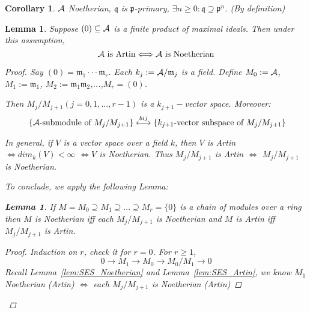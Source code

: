 \documentclass[11pt]{article}
\newtheorem{lemma}[thm]{Lemma}
\newtheorem{cor}[thm]{Corollary}
\newcommand{\scm}{{\mathfrak m}}
\newcommand{\scp}{{\mathfrak p}}
\newcommand{\scq}{\mathfrak q}
\newcommand{\cala}{{\cal A}}
\newcommand{\lrta}{\longrightarrow}
\newcommand{\llrta}{\longleftrightarrow}
\newcommand{\Llrta}{\Longleftrightarrow}
\begin{document}
\begin{cor}
$\cala$ Noetherian, $\scq$  is $\scp$-primary, $\exists n\geq 0:\scq\supseteq \scp^n$. (By definition)
\end{cor}

\begin{lemma}\label{lem:Artin_Noetherin_product_of_maximals}
Suppose $(0)\subseteq \cala$ is a finite product of maximal ideals. Then under this assumption, 
$$
\cala\text{ is Artin}\Llrta \cala\text{ is Noetherian}
$$
\begin{proof}
Say $(0)=\scm_1\cdot \cdot \cdot \scm_r$. Each $k_j:=\cala/\scm_j$ is a field. Define $M_0:=\cala$, $M_1:=\scm_1$, $M_2:=\scm_1\scm_2$,...,$M_r=(0)$.

Then $M_j/M_{j+1} (j=0,1,...,r-1)$ is a $k_{j+1}-$vector space. Moreover: 
$$
\text{
\{$\cala$-submodule of $M_j/M_{j+1}$\}}
\overset{bij}{\llrta}
\text{\{$k_{j+1}$-vector subspace of $M_j/M_{j+1}$\}}
$$

In general, if $V$ is a vector space over a field $k$, then $V$ is Artin $\Llrta dim_k(V)<\infty$ $\Llrta V$ is Noetherian. Thus $M_j/M_{j+1}$ is Artin $\Llrta$ $M_j/M_{j+1}$ is Noetherian.

To conclude, we apply the following Lemma:
\begin{lemma}
If $M=M_0\supseteq M_1\supseteq ...\supseteq M_r=\{0\}$ is a chain of modules over a ring then $M$ is Noetherian iff each $M_j/M_{j+1}$ is Noetherian and $M$ is Artin iff $M_j/M_{j+1}$ is Artin.
\begin{proof}
Induction on $r$, check it for $r=0$.
For $r\geq 1$, 
$$
0\lrta M_1\lrta M_0\lrta M_0/M_1\lrta 0
$$ Recall Lemma~\ref{lem:SES_Noetherian} and Lemma~\ref{lem:SES_Artin}, we know $M_1$ Noetherian (Artin) $\Llrta$ each $M_j/M_{j+1}$ is Noetherian (Artin)
\end{proof}
\end{lemma}
\end{proof}
\end{lemma}
\end{document}
